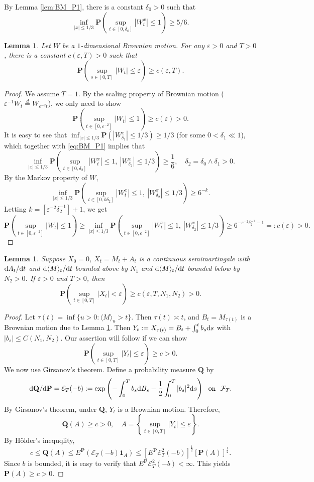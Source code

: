 \documentclass[twoside, 12pt]{book}
\numberwithin{equation}{chapter}
\newtheorem{lemma}[theorem]{Lemma}
\def\cE{{\mathcal E}}
\def\cF{{\mathcal F}}
\def\bP{{\mathbf P}}
\def\bQ{{\mathbf Q}}
\def\l{\left}
\def\r{\right}
\def\<{\langle}
\def\>{\rangle}
\def\geq{\geqslant}
\def\leq{\leqslant}
\def\1{{\mathbf{1}}}
\def\d{\text{\rm{d}}}
\def\eps{\varepsilon}
\begin{document}
	By Lemma \ref{lem:BM_P1}, there is a constant $\delta_0>0$ such that 
	\begin{equation}\label{eq:BM_P1}
		\inf_{|x|\leq 1/3} \bP\l(\sup_{t\in [0,\delta_0]} |W^x_t|\leq 1\r)\geq 5/6. 
	\end{equation}
	\begin{lemma}\label{lem:BM_P2}
		Let $W$ be a $1$-dimensional Brownian motion. For any $\eps>0$ and $T>0$, there is a constant $c(\eps, T)>0$ such that 
		\[
		\bP \l(\sup_{s\in [0,T]}|W_t| \leq \eps\r) \geq c(\eps, T). 
		\]
	\end{lemma}
	\begin{proof}
		We assume $T=1$. By the scaling property of Brownian motion ($\eps^{-1}W_t\overset{d}{=} W_{\eps^{-2}t}$), we only need to show 
		\[
		\bP \l(\sup_{t\in[0,\eps^{-2}]} |W_t|\leq 1 \r)\geq c(\eps)>0. 
		\]
		It is easy to see that $\inf_{|x|\leq 1/3} \bP (|W^x_{\delta_1}|\leq 1/3)\geq 1/3$ (for some $0<\delta_1\ll 1$), which together with \eqref{eq:BM_P1} implies that 
		\[
		\inf_{|x|\leq 1/3} \bP\l( \sup_{t\in [0,\delta_2]} |W_t^x|\leq 1, ~ |W_{\delta_2}^x| \leq 1/3\r) 
		\geq \frac{1}{6}, \quad \delta_2=\delta_0\wedge \delta_1>0.  
		\]
		By the Markov property of $W$, 
		\[
		\inf_{|x|\leq 1/3} \bP\l( \sup_{t\in [0, k\delta_2]} |W_t^x|\leq 1, ~ |W_{\delta_2}^x| \leq 1/3\r) 
		\geq 6^{-k}. 
		\]	
		Letting $k=[\eps^{-2}\delta_2^{-1}]+1$, we get  
		\[
		\bP\l( \sup_{t\in [0, \eps^{-2}]} |W_t|\leq 1 \r)\geq \inf_{|x|\leq 1/3} \bP\l( \sup_{t\in [0, \eps^{-2}]} |W_t^x|\leq 1, ~ |W_{\delta_2}^x| \leq 1/3\r) 
		\geq 6^{-\eps^{-2}\delta_2^{-1}-1}=: c(\eps)>0. 
		\]	
	\end{proof}
	\begin{lemma}\label{lem:support-mart}
		Suppose $X_0=0$, $X_t=M_t+A_t$ is a continuous semimartingale with $\d A_t / \d t$ and $\d\langle M\rangle_t / \d t$ bounded above by $N_1$ and $\d\langle M\rangle_t / \d t$ bounded below by $N_2>0$. If $\varepsilon>0$ and $T>0$, then
		$$
		\bP \left(\sup _{t\in [0,T]}\left|X_t\right|<\varepsilon\right) \geq c(\eps, T, N_1, N_2)>0. 
		$$
	\end{lemma}
	\begin{proof}
		Let $\tau(t)=\inf\{u>0: \<M\>_u>t\}$. Then $\tau(t)\asymp t$, and $B_t=M_{\tau(t)}$ is a Brownian motion due to Lemma \ref{lem:BM_P2}. Then $Y_t:= X_{\tau(t)}=B_t+ \int_0^t b_s \d s$ with $|b_s|\leq C(N_1, N_2)$. Our assertion will follow if we can show 
		\[
		\bP \l( \sup_{t\in [0,T]} |Y_t| \leq \eps \r)\geq c>0. 
		\]
		We now use Girsanov’s theorem. Define a probability measure $\bQ$ by 
		\[
		\d \bQ/ \d \bP = \cE_T(-b):= \exp \l( - \int_0^T b_s \d B_s-\frac{1}{2} \int_0^T |b_s|^2 \d s \r) ~\mbox{ on } ~ \cF_{T}. 
		\]
		By Girsanov’s theorem, under $\bQ$, $Y_t$ is a Brownian motion. Therefore, 
		\[
		\bQ \l( A \r)\geq c>0, \quad A= \l\{\sup_{t\in [0,T]} |Y_t| \leq \eps\r\}.  
		\]
		By Hölder's inequqlity, 
		\[
		c\leq \bQ(A) \leq E^{\bP} (\cE_T(-b) \1_A)\leq  [E^{\bP} \cE_T^2(-b)]^{\frac{1}{2}} [\bP(A)]^{\frac{1}{2}}.
		\]
		Since $b$ is bounded, it is easy to verify that $E^{\bP} \cE_T^2(-b)<\infty$. This yields $\bP(A)\geq c>0$. 
	\end{proof}
	
\end{document}
